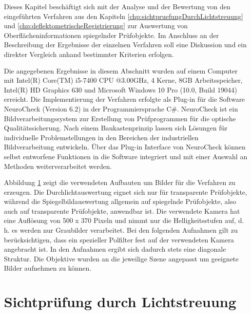 Dieses Kapitel beschäftigt sich mit der Analyse und der Bewertung von den eingeführten Verfahren aus den Kapiteln \ref{chp:sichtpruefungDurchLichtstreuung} und \ref{chp:deflektometrischeRegistrierung} zur Auswertung von Oberflächeninformationen spiegelnder Prüfobjekte.
Im Anschluss an der Beschreibung der Ergebnisse der einzelnen Verfahren soll eine Diskussion und ein direkter Vergleich anhand bestimmter Kriterien erfolgen.

\p
Die angegebenen Ergebnisse in diesem Abschnitt wurden auf einem Computer mit Intel(R) Core(TM) i5-7400 CPU @3.00GHz, 4 Kerne, 8GB Arbeitsspeicher, Intel(R) HD Graphics 630 und Microsoft Windows 10 Pro (10.0, Build 19044) erreicht.
Die Implementierung der Verfahren erfolgte als Plug-in für die Software NeuroCheck (Version 6.2) in der Programmiersprache C\#.
NeuroCheck ist ein Bildverarbeitungssystem zur Erstellung von Prüfprogrammen für die optische Qualitätssicherung.
Nach einem Baukastenprinzip lassen sich Lösungen für individuelle Problemstellungen in den Bereichen der industriellen Bildverarbeitung entwickeln.
Über das Plug-in Interface von NeuroCheck können selbst entworfene Funktionen in die Software integriert und mit einer Auswahl an Methoden weiterverarbeitet werden.

{
	\begin{figure}[H]
		\centering
		
		\label{tikz:abbAufbauFotos}
	\end{figure}
}

\noindent
Abbildung \ref{tikz:abbAufbauFotos} zeigt die verwendeten Aufbauten um Bilder für die Verfahren zu erzeugen.
Die Durchlichtauswertung eignet sich nur für transparente Prüfobjekte, während die Spiegelbildauswertung allgemein auf spiegelnde Prüfobjekte, also auch auf transparente Prüfobjekte, anwendbar ist.
Die verwendete Kamera hat eine Auflösung von 500 x 370 Pixeln und nimmt nur die Helligkeitsstufen auf, d. h. es werden nur Graubilder verarbeitet.
Bei den folgenden Aufnahmen gilt zu berücksichtigen, dass ein spezieller Polfilter fest auf der verwendeten Kamera angebracht ist.
In den Aufnahmen ergibt sich dadurch stets eine diagonale Struktur.
Die Objektive wurden an die jeweilige Szene angepasst um geeignete Bilder aufnehmen zu können.

{
	\FloatBarrier
    \section{Sichtprüfung durch Lichtstreuung}
    \label{sec:ergebnisseSichtpruefungDurchLichtstreuung}
    
}

